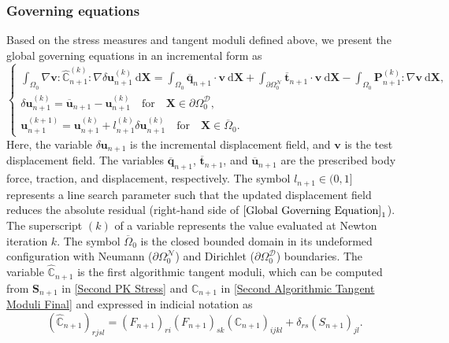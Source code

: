 \documentclass[preprint,11pt]{elsarticle}
\theoremstyle{definition}
\begin{document}
\subsubsection{Governing equations}

Based on the stress measures and tangent moduli defined above, we present the global governing equations in an incremental form as
\begin{equation} \label{Global Governing Equation}
    \left\{ \begin{array}{l}
        \displaystyle \int_{\Omega_0} \nabla \mathbf{v} : \widehat{\mathbb{C}}_{n+1}^{(k)} : \nabla \delta \mathbf{u}_{n+1}^{(k)}\ \text{d} \mathbf{X}
        = \int_{\Omega_0} \overline{\mathbf{q}}_{n+1} \cdot \mathbf{v}\ \text{d} \mathbf{X} 
        + \int_{\partial \Omega_0^\mathcal{N}} \overline{\mathbf{t}}_{n+1} \cdot \mathbf{v}\ \text{d} \mathbf{X}
        - \int_{\Omega_0} \mathbf{P}_{n+1}^{(k)} : \nabla \mathbf{v}\ \text{d} \mathbf{X}, \\[12pt]

        \delta \mathbf{u}_{n+1}^{(k)} = \overline{\mathbf{u}}_{n+1} - \mathbf{u}_{n+1}^{(k)} \quad \text{for} \quad \mathbf{X} \in \partial \Omega_0^\mathcal{D}, \\[12pt]
        
        \mathbf{u}_{n+1}^{(k+1)} = \mathbf{u}_{n+1}^{(k)} + l_{n+1}^{(k)} \delta \mathbf{u}_{n+1}^{(k)} \quad \text{for} \quad \mathbf{X} \in \overline{\Omega}_0.
    \end{array} \right.
\end{equation}
Here, the variable $\delta \mathbf{u}_{n+1}$ is the incremental displacement field, and $\mathbf{v}$ is the test displacement field. The variables $\overline{\mathbf{q}}_{n+1}$, $\overline{\mathbf{t}}_{n+1}$, and $\overline{\mathbf{u}}_{n+1}$ are the prescribed body force, traction, and displacement, respectively. The symbol $l_{n+1} \in (0, 1]$ represents a line search parameter such that the updated displacement field reduces the absolute residual (right-hand side of $\eqref{Global Governing Equation}_1$). The superscript $(k)$ of a variable represents the value evaluated at Newton iteration $k$. The symbol $\overline{\Omega}_0$ is the closed bounded domain in its undeformed configuration with Neumann ($\partial \Omega_0^\mathcal{N}$) and Dirichlet ($\partial \Omega_0^\mathcal{D}$) boundaries. The variable $\widehat{\mathbb{C}}_{n+1}$ is the first algorithmic tangent moduli, which can be computed from $\mathbf{S}_{n+1}$ in \eqref{Second PK Stress} and $\mathbb{C}_{n+1}$ in \eqref{Second Algorithmic Tangent Moduli Final} and expressed in indicial notation as
\begin{equation*}
    ( \widehat{\mathbb{C}}_{n+1} )_{rjsl} = \left( F_{n+1} \right)_{ri} \left( F_{n+1} \right)_{sk} \left( \mathbb{C}_{n+1} \right)_{ijkl} + \delta_{rs} \left( S_{n+1} \right)_{jl}.
\end{equation*}
\end{document}
